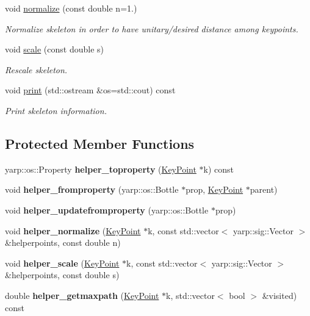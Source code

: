 \begin{DoxyCompactItemize}
void \mbox{\hyperlink{classassistive__rehab_1_1Skeleton_a7753cc8d2b43e27eaf7bf9ef640a99cb}{normalize}} (const double n=1.)
\begin{DoxyCompactList}\small\item\em Normalize skeleton in order to have unitary/desired distance among keypoints. \end{DoxyCompactList}\item 
void \mbox{\hyperlink{classassistive__rehab_1_1Skeleton_a21fded128e2240e4dd507030b7386670}{scale}} (const double s)
\begin{DoxyCompactList}\small\item\em Rescale skeleton. \end{DoxyCompactList}\item 
\mbox{\label{classassistive__rehab_1_1Skeleton_a58289ea0ba49220afac3e8d7128493b4}} 
void \mbox{\hyperlink{classassistive__rehab_1_1Skeleton_a58289ea0ba49220afac3e8d7128493b4}{print}} (std\+::ostream \&os=std\+::cout) const
\begin{DoxyCompactList}\small\item\em Print skeleton information. \end{DoxyCompactList}\end{DoxyCompactItemize}
\subsection*{Protected Member Functions}
\begin{DoxyCompactItemize}
\item 
\mbox{\label{classassistive__rehab_1_1Skeleton_ae448d21825bfd36eccb328d16fef995a}} 
yarp\+::os\+::\+Property {\bfseries helper\+\_\+toproperty} (\mbox{\hyperlink{classassistive__rehab_1_1KeyPoint}{Key\+Point}} $\ast$k) const
\item 
\mbox{\label{classassistive__rehab_1_1Skeleton_a8e8fcac9b911ce9eaa0a97b81bffb357}} 
void {\bfseries helper\+\_\+fromproperty} (yarp\+::os\+::\+Bottle $\ast$prop, \mbox{\hyperlink{classassistive__rehab_1_1KeyPoint}{Key\+Point}} $\ast$parent)
\item 
\mbox{\label{classassistive__rehab_1_1Skeleton_a8b1fa988e848ef1fc06439be8eaa19a4}} 
void {\bfseries helper\+\_\+updatefromproperty} (yarp\+::os\+::\+Bottle $\ast$prop)
\item 
\mbox{\label{classassistive__rehab_1_1Skeleton_a574ad07752a2a59ea765e10282998bb4}} 
void {\bfseries helper\+\_\+normalize} (\mbox{\hyperlink{classassistive__rehab_1_1KeyPoint}{Key\+Point}} $\ast$k, const std\+::vector$<$ yarp\+::sig\+::\+Vector $>$ \&helperpoints, const double n)
\item 
\mbox{\label{classassistive__rehab_1_1Skeleton_aefdf8624092fcc2b5458b0be108da01a}} 
void {\bfseries helper\+\_\+scale} (\mbox{\hyperlink{classassistive__rehab_1_1KeyPoint}{Key\+Point}} $\ast$k, const std\+::vector$<$ yarp\+::sig\+::\+Vector $>$ \&helperpoints, const double s)
\item 
\mbox{\label{classassistive__rehab_1_1Skeleton_a66ea19f4fbec2b654e394686180abf43}} 
double {\bfseries helper\+\_\+getmaxpath} (\mbox{\hyperlink{classassistive__rehab_1_1KeyPoint}{Key\+Point}} $\ast$k, std\+::vector$<$ bool $>$ \&visited) const
\end{DoxyCompactItemize}
